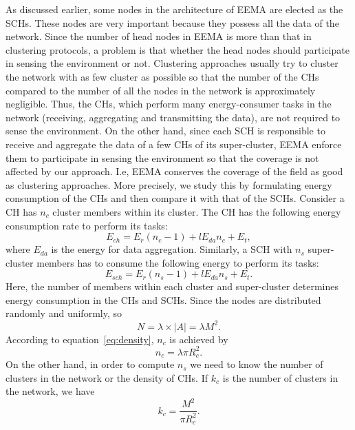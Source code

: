 \documentclass[journal]{IEEEtran}
\begin{document}
As discussed earlier,  some nodes in the architecture of EEMA are elected as the SCHs.  These nodes are very important because they possess all the data of the network.  Since the number of head nodes in EEMA is more than that in clustering protocols, a problem is that whether the head nodes should participate in sensing the environment or not.  Clustering approaches usually try to cluster the network with as few cluster as possible so that the number of the CHs compared to the number of all the nodes in the network is approximately negligible.  Thus, the CHs, which perform many energy-consumer tasks in the network (receiving, aggregating and transmitting the data), are not required to sense the environment.  On the other hand, since each SCH is responsible to receive and aggregate the data of a few CHs of its super-cluster, EEMA enforce them to participate in sensing the environment so that the coverage is not affected by our approach.  I.e, EEMA conserves the coverage of the field as good as clustering approaches.  More precisely,  we study this by formulating energy consumption of the CHs and then compare it with that of the SCHs.  Consider a CH has $n_{c}$ cluster members within its cluster.  The CH has the following energy consumption rate  to perform its tasks:
\begin{equation}
\label{eq:E_ch}
E_{ch}=E_{r}(n_{c}-1) + lE_{da}n_{c} + E_{t}, 
\end{equation} 
where $E_{da}$ is the energy for data aggregation.  Similarly, a SCH with $n_s$ super-cluster members has to consume the following energy to perform its tasks:
\begin{equation}
\label{eq:E_sch}
E_{sch}=E_{r}(n_{s}-1) + lE_{da}n_{s} + E_{t}. 
\end{equation} 
Here, the number of members within each cluster and super-cluster determines energy consumption in the CHs and SCHs.  Since the nodes are distributed randomly and uniformly, so
\begin{equation}
\label{eq:density}
N=\lambda \times |A|=\lambda M^2. 
\end{equation}
According to equation~\eqref{eq:density}, $n_{c}$ is achieved by
\begin{equation}
\label{eq:n-c}
n_c=\lambda\pi R_{c}^2. 
\end{equation}
On the other hand, in order to compute $n_s$ we need to know the number of clusters in the network or the density of CHs. 
If $k_c$ is the number of clusters in the network, we have 
\begin{equation}
\label{eq:cluster-num}
k_c=\frac{M^2}{\pi R_{c}^2}. 
\end{equation}
\end{document}
